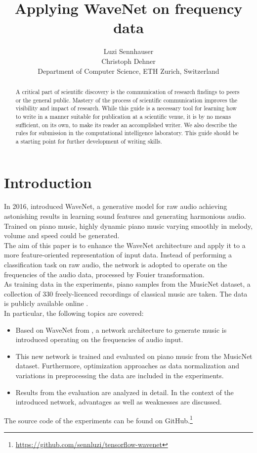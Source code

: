\documentclass[10pt,conference,compsocconf]{IEEEtran}
\begin{document}
\title{Applying WaveNet on frequency data}

\author{
  Luzi Sennhauser\\
  Christoph Dehner\\
  Department of Computer Science, ETH Zurich, Switzerland
}

\maketitle

\begin{abstract}
  A critical part of scientific discovery is the
  communication of research findings to peers or the general public.
  Mastery of the process of scientific communication improves the
  visibility and impact of research. While this guide is a necessary
  tool for learning how to write in a manner suitable for publication
  at a scientific venue, it is by no means sufficient, on its own, to
  make its reader an accomplished writer. We also describe the rules
  for submission in the computational intelligence laboratory.
  This guide should be a
  starting point for further development of writing skills.
\end{abstract}

\section{Introduction}
In 2016, \cite{wavenet} introduced WaveNet, a generative model for raw audio achieving astonishing results in learning sound features and generating harmonious audio. Trained on piano music, highly dynamic piano music varying smoothly in melody, volume and speed could be generated.\\
The aim of this paper is to enhance the WaveNet architecture and apply it to a more feature-oriented representation of input data. Instead of performing a classification task on raw audio, the network is adopted to operate on the frequencies of the audio data, processed by Fouier transformation.\\
As training data in the experiments, piano samples from the MusicNet dataset, a collection of 330 freely-licenced recordings of classical music are taken. The data is publicly available online \cite{musicnet}.\\
In particular, the following topics are covered:
\begin{itemize}
\item Based on WaveNet from \cite{wavenet}, a network architecture to generate music is introduced operating on the frequencies of audio input.
\item This new network is trained and evaluated on piano music from the MusicNet dataset. Furthermore, optimization approaches as data normalization and variations in preprocessing the data are included in the experiments.
\item Results from the evaluation are analyzed in detail. In the context of the introduced network, advantages as well as weaknesses are discussed. 
\end{itemize}
The source code of the experiments can be found on GitHub.\footnote{\url{https://github.com/sennluzi/tensorflow-wavenet}}
\end{document}
